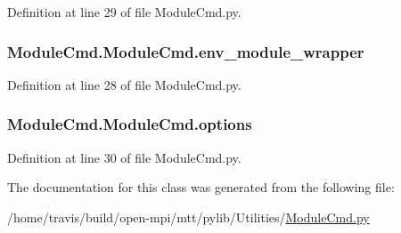 Definition at line 29 of file Module\-Cmd.\-py.

\hypertarget{class_module_cmd_1_1_module_cmd_ae60edec82191b5a7a1830495b1ca2e3e}{
\subsubsection[{env\-\_\-module\-\_\-wrapper}]{\setlength{\rightskip}{0pt plus 5cm}Module\-Cmd.\-Module\-Cmd.\-env\-\_\-module\-\_\-wrapper}}\label{class_module_cmd_1_1_module_cmd_ae60edec82191b5a7a1830495b1ca2e3e}


Definition at line 28 of file Module\-Cmd.\-py.

\hypertarget{class_module_cmd_1_1_module_cmd_a981a0fc879a722b76faa16b4289ab953}{
\subsubsection[{options}]{\setlength{\rightskip}{0pt plus 5cm}Module\-Cmd.\-Module\-Cmd.\-options}}\label{class_module_cmd_1_1_module_cmd_a981a0fc879a722b76faa16b4289ab953}


Definition at line 30 of file Module\-Cmd.\-py.



The documentation for this class was generated from the following file\-:\begin{DoxyCompactItemize}
\item 
/home/travis/build/open-\/mpi/mtt/pylib/\-Utilities/\hyperlink{_module_cmd_8py}{Module\-Cmd.\-py}\end{DoxyCompactItemize}
